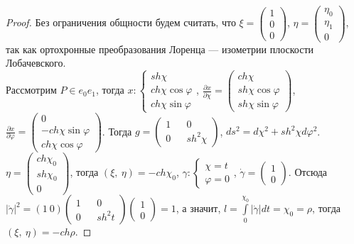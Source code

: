 \documentclass[12pt]{article}
\theoremstyle{plain}
\renewcommand{\phi}{\varphi}
\begin{document}
    \begin{proof}
        Без ограничения общности будем считать, что $\xi=\begin{pmatrix}
            1\\
            0\\
            0
        \end{pmatrix}$, $\eta=\begin{pmatrix}
            \eta_0\\
            \eta_1\\
            0
        \end{pmatrix}$, так как ортохронные преобразования Лоренца --- изометрии плоскости Лобачевского.\\
        Рассмотрим $P\in e_0e_1$, тогда $x:\begin{cases}
            sh\chi\\
            ch\chi\cos\phi\\
            ch\chi\sin\phi
        \end{cases}$, $\frac{\partial
         x}{\partial\chi}=\begin{pmatrix}
            ch\chi\\
            sh\chi\cos\phi\\
            sh\chi\sin\phi
        \end{pmatrix}$, $\frac{\partial
         x}{\partial\phi}=\begin{pmatrix}
            0\\
            -ch\chi\sin\phi\\
            ch\chi\cos\phi
        \end{pmatrix}$. Тогда $g=\begin{pmatrix}
            1 && 0\\
            0 && sh^2\chi
        \end{pmatrix}$, $ds^2=d\chi^2+sh^2\chi d\phi^2$.
        $\eta=\begin{pmatrix}
            ch\chi_0\\
            sh\chi_0\\
            0
        \end{pmatrix}$, тогда $(\xi, \ \eta)=-ch\chi_0$, $\gamma:\begin{cases}
            \chi=t\\
            \phi=0
        \end{cases}$, $\dot{\gamma}=\begin{pmatrix}
            1\\
            0
        \end{pmatrix}$. Отсюда $|\dot{\gamma}|^2=(1 \ 0)\begin{pmatrix}
            1 && 0\\
            0 && sh^2t
        \end{pmatrix}\begin{pmatrix}
            1\\
            0
        \end{pmatrix}=1$, а значит, $l=\int\limits_0^{\chi_0}|\dot{\gamma}|dt=\chi_0=\rho$, тогда $(\xi, \ \eta)=-ch\rho$.
    \end{proof}
\end{document}
